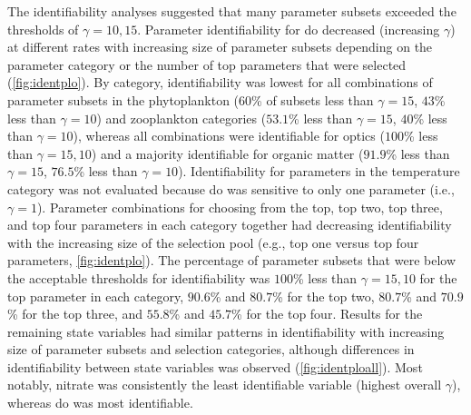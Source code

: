 \documentclass[review]{elsarticle}\usepackage[]{graphicx}\usepackage[]{color}
\begin{document}
The identifiability analyses suggested that many parameter subsets exceeded the thresholds of $\gamma = 10, 15$.  Parameter identifiability for \ac{do} decreased (increasing $\gamma$) at different rates with increasing size of parameter subsets depending on the parameter category or the number of top parameters that were selected (\cref{fig:identplo}). By category, identifiability was lowest for all combinations of parameter subsets in the phytoplankton ($60$\% of subsets less than $\gamma = 15$, $43$\% less than $\gamma = 10$) and zooplankton categories ($53.1$\% less than $\gamma = 15$, $40$\% less than $\gamma = 10$), whereas all combinations were identifiable for optics ($100$\% less than $\gamma = 15, 10$) and a majority identifiable for organic matter ($91.9$\% less than $\gamma = 15$, $76.5$\% less than $\gamma = 10$). Identifiability for parameters in the temperature category was not evaluated because \ac{do} was sensitive to only one parameter (i.e., $\gamma = 1$). Parameter combinations for choosing from the top, top two, top three, and top four parameters in each category together had decreasing identifiability with the increasing size of the selection pool (e.g., top one versus top four parameters, \cref{fig:identplo}).  The percentage of parameter subsets that were below the acceptable thresholds for identifiability was $100$\% less than $\gamma = 15, 10$ for the top parameter in each category, $90.6$\% and $80.7$\% for the top two, $80.7$\% and $70.9$\% for the top three, and $55.8$\% and $45.7$\% for the top four.  Results for the remaining state variables had similar patterns in identifiability with increasing size of parameter subsets and selection categories, although differences in identifiability between state variables was observed (\cref{fig:identploall}).  Most notably, nitrate was consistently the least identifiable variable (highest overall $\gamma$), whereas \ac{do} was most identifiable.
\end{document}
